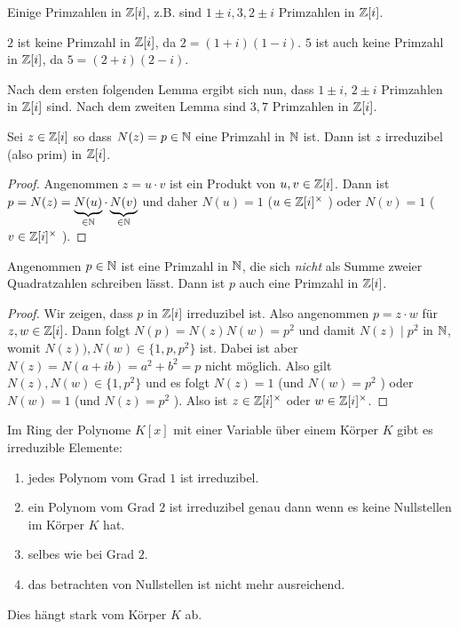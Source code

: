 \begin{eg}
	Einige Primzahlen in $\mathbb{Z}[i]$, z.B. sind $1\pm i,3,2\pm i$ Primzahlen in $\mathbb{Z}[i]$.

	$2$ ist keine Primzahl in $\mathbb{Z}[i]$, da $2 = (1+i)(1-i)$.
	$5$ ist auch keine Primzahl in $\mathbb{Z}[i]$, da $5 = (2+i)(2-i)$.

	Nach dem ersten folgenden Lemma ergibt sich nun, dass $1 \pm i$, $2 \pm i$ Primzahlen in $\mathbb{Z}[i]$ sind.
	Nach dem zweiten Lemma sind $3,7$ Primzahlen in $\mathbb{Z}[i]$.
\end{eg}

\begin{lemma}
	Sei $z \in \mathbb{Z}[i]$ so dass $N(z) = p \in \mathbb{N}$ eine Primzahl in $\mathbb{N}$ ist.
	Dann ist $z$ irreduzibel (also prim) in $\mathbb{Z}[i]$.
\end{lemma}

\begin{proof}
	Angenommen $z = u \cdot v$ ist ein Produkt von $u,v \in \mathbb{Z}[i]$.
	Dann ist $p = N(z) = \underbrace{N(u)}_{\in \mathbb{N}} \cdot \underbrace{N(v)}_{\in\mathbb{N}}$ und daher $N(u) = 1$ ($u \in \mathbb{Z}[i]^{\times}$ ) oder $N(v) = 1$ ($v \in \mathbb{Z}[i]^{\times}$ ).
\end{proof}

\begin{lemma}
	Angenommen $p \in \mathbb{N}$ ist eine Primzahl in $\mathbb{N}$, die sich \emph{nicht} als Summe zweier Quadratzahlen schreiben lässt.
	Dann ist $p$ auch eine Primzahl in $\mathbb{Z}[i]$.
\end{lemma}

\begin{proof}
	Wir zeigen, dass $p$ in $\mathbb{Z}[i]$ irreduzibel ist.
	Also angenommen $p = z \cdot w$ für $z,w \in \mathbb{Z}[i]$.
	Dann folgt $N(p) = N(z) N(w) = p^2$ und damit $N(z) \mid p^2$ in $\mathbb{N}$, womit $N(z)),N(w) \in \{1,p,p^2\} $ ist.
	Dabei ist aber $N(z) = N(a+ib) = a^2 + b^2 = p$ nicht möglich.
	Also gilt $N(z),N(w) \in \{1,p^2\}$ und es folgt $N(z) = 1$ (und $N(w) = p^2$ ) oder $N(w) = 1$ (und $N(z) = p^2$ ).
	Also ist $z \in \mathbb{Z}[i]^{\times}$ oder $w \in \mathbb{Z}[i]^{\times }$.
\end{proof}

\begin{eg}
	Im Ring der Polynome $K[x]$ mit einer Variable über einem Körper $K$ gibt es irreduzible Elemente:
	\begin{enumerate}[{Grad} 1:]
		\item jedes Polynom vom Grad $1$ ist irreduzibel.
		\item ein Polynom vom Grad $2$ ist irreduzibel genau dann wenn es keine Nullstellen im Körper $K$ hat.
		\item selbes wie bei Grad $2$.
		\item das betrachten von Nullstellen ist nicht mehr ausreichend. 
	\end{enumerate}
	Dies hängt stark vom Körper $K$ ab.
\end{eg}


